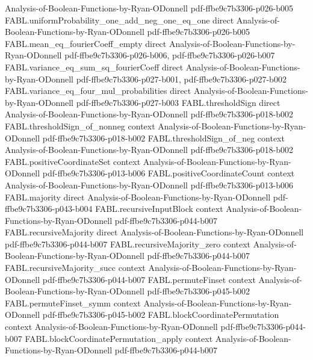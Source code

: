 \begin{theorem}
  {Analysis-of-Boolean-Functions-by-Ryan-ODonnell}
  {pdf-ffbe9c7b3306-p026-b005}
\proofstep
  {FABL.uniformProbability_one_add_neg_one_eq_one}
  {direct}
  {Analysis-of-Boolean-Functions-by-Ryan-ODonnell}
  {pdf-ffbe9c7b3306-p026-b005}
\proofstep
  {FABL.mean_eq_fourierCoeff_empty}
  {direct}
  {Analysis-of-Boolean-Functions-by-Ryan-ODonnell}
  {pdf-ffbe9c7b3306-p026-b006,
    pdf-ffbe9c7b3306-p026-b007}
\proofstep
  {FABL.variance_eq_sum_sq_fourierCoeff}
  {direct}
  {Analysis-of-Boolean-Functions-by-Ryan-ODonnell}
  {pdf-ffbe9c7b3306-p027-b001,
    pdf-ffbe9c7b3306-p027-b002}
\proofstep
  {FABL.variance_eq_four_mul_probabilities}
  {direct}
  {Analysis-of-Boolean-Functions-by-Ryan-ODonnell}
  {pdf-ffbe9c7b3306-p027-b003}
\proofstep
  {FABL.thresholdSign}
  {direct}
  {Analysis-of-Boolean-Functions-by-Ryan-ODonnell}
  {pdf-ffbe9c7b3306-p018-b002}
\proofstep
  {FABL.thresholdSign_of_nonneg}
  {context}
  {Analysis-of-Boolean-Functions-by-Ryan-ODonnell}
  {pdf-ffbe9c7b3306-p018-b002}
\proofstep
  {FABL.thresholdSign_of_neg}
  {context}
  {Analysis-of-Boolean-Functions-by-Ryan-ODonnell}
  {pdf-ffbe9c7b3306-p018-b002}
\proofstep
  {FABL.positiveCoordinateSet}
  {context}
  {Analysis-of-Boolean-Functions-by-Ryan-ODonnell}
  {pdf-ffbe9c7b3306-p013-b006}
\proofstep
  {FABL.positiveCoordinateCount}
  {context}
  {Analysis-of-Boolean-Functions-by-Ryan-ODonnell}
  {pdf-ffbe9c7b3306-p013-b006}
\proofstep
  {FABL.majority}
  {direct}
  {Analysis-of-Boolean-Functions-by-Ryan-ODonnell}
  {pdf-ffbe9c7b3306-p043-b004}
\proofstep
  {FABL.recursiveInputBlock}
  {context}
  {Analysis-of-Boolean-Functions-by-Ryan-ODonnell}
  {pdf-ffbe9c7b3306-p044-b007}
\proofstep
  {FABL.recursiveMajority}
  {direct}
  {Analysis-of-Boolean-Functions-by-Ryan-ODonnell}
  {pdf-ffbe9c7b3306-p044-b007}
\proofstep
  {FABL.recursiveMajority_zero}
  {context}
  {Analysis-of-Boolean-Functions-by-Ryan-ODonnell}
  {pdf-ffbe9c7b3306-p044-b007}
\proofstep
  {FABL.recursiveMajority_succ}
  {context}
  {Analysis-of-Boolean-Functions-by-Ryan-ODonnell}
  {pdf-ffbe9c7b3306-p044-b007}
\proofstep
  {FABL.permuteFinset}
  {context}
  {Analysis-of-Boolean-Functions-by-Ryan-ODonnell}
  {pdf-ffbe9c7b3306-p045-b002}
\proofstep
  {FABL.permuteFinset_symm}
  {context}
  {Analysis-of-Boolean-Functions-by-Ryan-ODonnell}
  {pdf-ffbe9c7b3306-p045-b002}
\proofstep
  {FABL.blockCoordinatePermutation}
  {context}
  {Analysis-of-Boolean-Functions-by-Ryan-ODonnell}
  {pdf-ffbe9c7b3306-p044-b007}
\proofstep
  {FABL.blockCoordinatePermutation_apply}
  {context}
  {Analysis-of-Boolean-Functions-by-Ryan-ODonnell}
  {pdf-ffbe9c7b3306-p044-b007}

\end{theorem}
